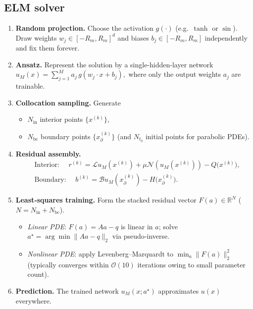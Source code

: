 \documentclass{article}
\begin{document}
\subsection{ELM solver}
\begin{enumerate}
\item \textbf{Random projection.}  Choose the activation $g(\cdot)$ (e.g.\ $\tanh$ or $\sin$).  Draw weights $w_j\in[-R_m,R_m]^d$ and biases $b_j\in[-R_m,R_m]$ independently and fix them forever.
\item \textbf{Ansatz.}  Represent the solution by a single‑hidden‑layer network
\(
u_M(x)=\sum_{j=1}^{M} a_j\,g(w_j\!\cdot\! x + b_j),
\)
where only the output weights $a_j$ are trainable.
\item \textbf{Collocation sampling.}  Generate
  \begin{itemize}
    \item $N_{\text{in}}$ interior points $\{x^{(k)}\}$,
    \item $N_{\text{bc}}$ boundary points $\{x^{(k)}_{\partial}\}$ (and $N_{t_0}$ initial points for parabolic PDEs).
  \end{itemize}
\item \textbf{Residual assembly.}
  \begin{align*}
  &\text{Interior: } \quad r^{(k)} = \mathcal{L}u_M(x^{(k)})+\mu\mathcal{N}(u_M(x^{(k)}))-Q\bigl(x^{(k)}\bigr),\\
  &\text{Boundary: } \quad b^{(k)} = \mathcal{B}u_M(x^{(k)}_{\partial})-H\bigl(x^{(k)}_{\partial}\bigr).
  \end{align*}
\item \textbf{Least‑squares training.}  Form the stacked residual vector $F(a)\in\mathbb{R}^{N}$ ($N=N_{\text{in}}+N_{\text{bc}}$).\\[2pt]
  \begin{itemize}
    \item \emph{Linear PDE}: $F(a)=Aa-q$ is linear in $a$; solve $a^\star=\arg\min\|Aa-q\|_2$ via pseudo‑inverse.
    \item \emph{Nonlinear PDE}: apply Levenberg–Marquardt to $\min_a \|F(a)\|_2^2$ (typically converges within $\mathcal{O}(10)$ iterations owing to small parameter count).
  \end{itemize}
\item \textbf{Prediction.}  The trained network $u_M(x;a^\star)$ approximates $u(x)$ everywhere.
\end{enumerate}
\end{document}
